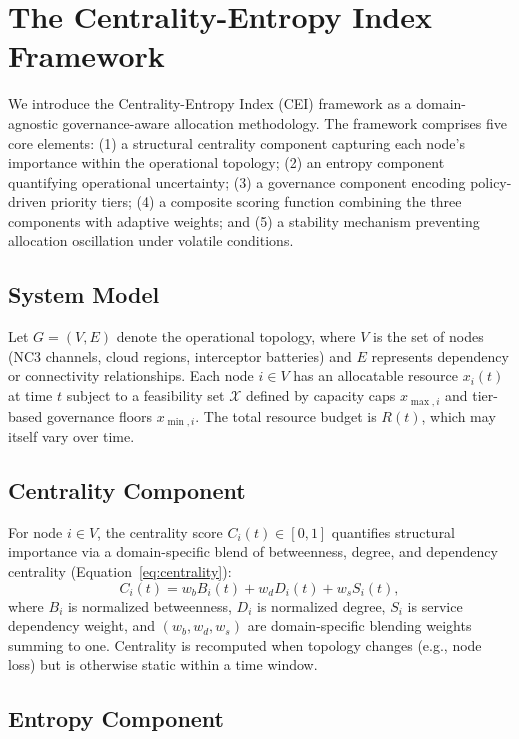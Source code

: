\documentclass[runningheads]{llncs}
\begin{document}
\section{The Centrality-Entropy Index Framework}
\label{sec:framework}

We introduce the Centrality-Entropy Index (CEI) framework as a domain-agnostic governance-aware allocation methodology. The framework comprises five core elements: (1) a structural centrality component capturing each node's importance within the operational topology; (2) an entropy component quantifying operational uncertainty; (3) a governance component encoding policy-driven priority tiers; (4) a composite scoring function combining the three components with adaptive weights; and (5) a stability mechanism preventing allocation oscillation under volatile conditions.

\subsection{System Model}

Let $G = (V, E)$ denote the operational topology, where $V$ is the set of nodes (NC3 channels, cloud regions, interceptor batteries) and $E$ represents dependency or connectivity relationships. Each node $i \in V$ has an allocatable resource $x_i(t)$ at time $t$ subject to a feasibility set $\mathcal{X}$ defined by capacity caps $x_{\max,i}$ and tier-based governance floors $x_{\min,i}$. The total resource budget is $R(t)$, which may itself vary over time.

\subsection{Centrality Component}

For node $i \in V$, the centrality score $C_i(t) \in [0,1]$ quantifies structural importance via a domain-specific blend of betweenness, degree, and dependency centrality (Equation~\ref{eq:centrality}):
\begin{equation}
C_i(t) = w_b B_i(t) + w_d D_i(t) + w_s S_i(t),
\label{eq:centrality}
\end{equation}
where $B_i$ is normalized betweenness, $D_i$ is normalized degree, $S_i$ is service dependency weight, and $(w_b, w_d, w_s)$ are domain-specific blending weights summing to one. Centrality is recomputed when topology changes (e.g., node loss) but is otherwise static within a time window.

\subsection{Entropy Component}
\end{document}
